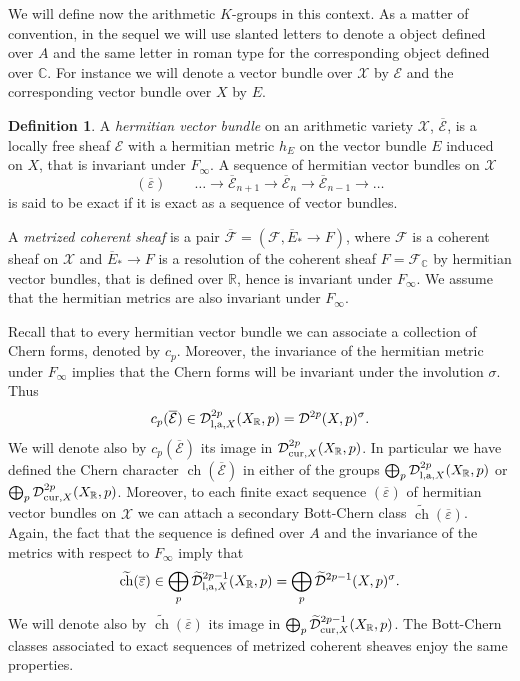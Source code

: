 \documentclass[10pt,twoside]{article}
\numberwithin{equation}{section}
\theoremstyle{plain}
\theoremstyle{definition}
\newtheorem{definition}[equation]{Definition}
\DeclareMathOperator{\ch}{ch}
\newcommand{\CC}{{\mathbb C}}
\newcommand{\las}{{\text{\rm l,a}}}
\newcommand{\D}{\text{{\rm cur}}}
\begin{document}
We will define now the arithmetic $K$-groups in this context.
As a matter of convention, in the sequel
we will
use slanted letters to denote a object defined over $A$ and the
same letter in roman type for the corresponding object defined over
$\mathbb{C}$. For instance we will denote a vector bundle over
$\mathcal{X}$ by $\mathcal{E}$ and the corresponding vector bundle
over $X$ by $E$.


\begin{definition}
  A \emph{hermitian vector bundle} on an arithmetic
  variety $\mathcal{X}$, $\overline{\mathcal{E}}$, is a locally free
  sheaf $\mathcal{E}$ with a hermitian metric $h_E$ on the vector
  bundle $E$ induced on $X$, that is invariant under
  $F_{\infty}$. A sequence of hermitian vector bundles on
  $\mathcal{X}$
  $$(\overline{\varepsilon})\qquad \ldots \longrightarrow
  \overline{\mathcal{E}}_{n+1} \longrightarrow
  \overline{\mathcal{E}}_n \longrightarrow
  \overline{\mathcal{E}}_{n-1} \longrightarrow \ldots$$ is said to be
  exact if it is exact as a sequence of vector bundles.

  A \emph{metrized coherent sheaf} is a pair
  $\overline{\mathcal{F}}=(\mathcal{F},\overline E_{\ast}\to
  F)$, where $\mathcal{F}$ is a coherent sheaf on
  $\mathcal{X}$ and $\overline E_{\ast}\to
  F$ is a resolution of the coherent sheaf
  $F=\mathcal{F}_{\CC}$ by hermitian vector bundles, that is defined over
  $\mathbb{R}$, hence is invariant under $F_{\infty}$. We assume that
  the hermitian metrics are also invariant under $F_{\infty}$.
\end{definition}

Recall that to every hermitian vector bundle 
we can associate a collection of Chern
forms, denoted by $c_{p}$. Moreover, the invariance of the hermitian
metric under $F_{\infty}$ implies that 
the Chern forms will be invariant under the involution $\sigma $. Thus 
$$c_p(\overline
{\mathcal{E}})\in\mathcal{D}^{2p}_{\las,X}(X_{\mathbb{R}},p)=
\mathcal{D}^{2p}(X,p)^{\sigma}.$$  
 We will denote also by
$c_{p}(\overline {\mathcal{E}})$ its image in 
$\mathcal{D}^{2p}_{\D,X}(X_{\mathbb{R}},p)$. In particular we have
defined the 
Chern character $\ch(\overline {\mathcal{E}})$ in either of the
groups $\bigoplus _{p}\mathcal{D}^{2p}_{\las,X}(X_{\mathbb{R}},p)$ or 
$\bigoplus_{p}\mathcal{D}^{2p}_{\D,X}(X_{\mathbb{R}},p)$. Moreover, to
each 
finite exact sequence $(\overline{\varepsilon})$ of hermitian vector
bundles on $\mathcal{X}$ we can attach a secondary Bott-Chern class
$\widetilde{\ch}(\overline{\varepsilon})$. Again, the fact that the
sequence is defined over $A$ and the invariance of the metrics with
respect to $F_{\infty}$ imply that
$$
\widetilde{\ch}(\overline{\varepsilon})\in 
\bigoplus
_{p}\widetilde{\mathcal{D}}^{2p-1}_{\las,X}(X_{\mathbb{R}},p)= 
\bigoplus _{p}\widetilde{\mathcal{D}}^{2p-1}(X,p)^{\sigma}.
$$
We will denote also by $\widetilde{\ch}(\overline{\varepsilon})$ its
image in $\bigoplus
_{p}\widetilde{\mathcal{D}}^{2p-1}_{\D,X}(X_{\mathbb{R}},p)$. The
Bott-Chern 
classes associated to exact sequences of metrized coherent sheaves
enjoy the same properties.
\end{document}

